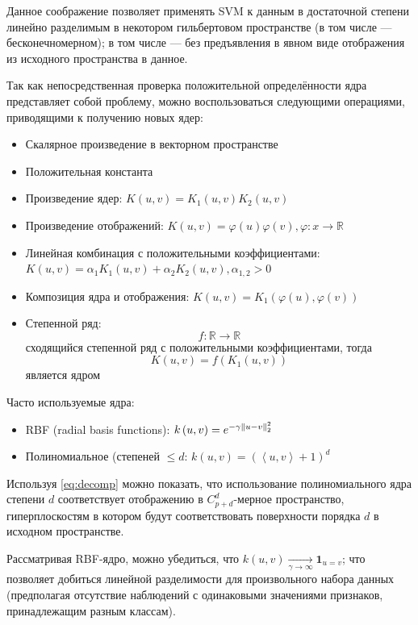 \documentclass[11pt, a4paper]{article}\usepackage[]{graphicx}\usepackage[]{color}
\begin{document}
Данное соображение позволяет применять SVM к данным в достаточной степени линейно разделимым в некотором гильбертовом пространстве
(в том числе --- бесконечномерном); в том числе --- без предъявления в явном виде отображения из исходного пространства в данное.

Так как непосредственная проверка положительной определённости ядра представляет собой проблему, можно
воспользоваться следующими операциями, приводящими к получению новых ядер:
	\begin{itemize}
		\item Скалярное произведение в векторном пространстве
		\item Положительная константа
		\item Произведение ядер: $K\left(u,v\right)=K_1\left(u,v\right)K_2\left(u, v\right)$
		\item Произведение отображений: $K\left(u, v\right)=\varphi\left(u\right)\varphi\left(v\right), \varphi:x\rightarrow \mathbb{R}$
		\item Линейная комбинация с положительными коэффициентами: $K\left(u, v\right)=\alpha_1K_1\left(u,v\right)+\alpha_2K_2\left(u, v\right), \alpha_{1,2}>0$
		\item Композиция ядра и отображения: $K\left(u, v\right)=K_1\left(\varphi\left(u\right),\varphi\left(v\right)\right)$
		\item Степенной ряд: 
			$$f: \mathbb{R}\rightarrow\mathbb{R}$$
			сходящийся степенной ряд с положительными коэффициентами, тогда
			$$K\left(u, v\right)=f\left(K_1\left(u,v\right)\right)$$
			является ядром
	\end{itemize}

Часто используемые ядра:
\begin{itemize}
	\item RBF (radial basis functions): $k\left(u, v\right)=e^{-\gamma\norm{u-v}_2^2}$
	\item Полиномиальное (степеней $\leq d$: $k\left(u, v\right)=\left(\left\langle u, v\right\rangle + 1\right)^d$
\end{itemize}

Используя \eqref{eq:decomp} можно показать, что использование полиномиального ядра степени $d$ соответствует
отображению в $C_{p+d}^{d}$-мерное пространство, гиперплоскостям в котором будут соответствовать поверхности
порядка $d$ в исходном пространстве.

Рассматривая RBF-ядро, можно убедиться, что $k\left(u,v\right)\xrightarrow[\gamma\rightarrow\infty]{}\mathbf{1}_{u=v}$;
что позволяет добиться линейной разделимости для произвольного набора данных (предполагая отсутствие наблюдений
с одинаковыми значениями признаков, принадлежащим разным классам).
\end{document}
